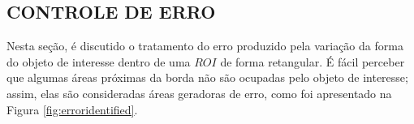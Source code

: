 \subsection{CONTROLE DE ERRO}

Nesta seção, é discutido o tratamento do erro produzido pela variação da forma do objeto de interesse dentro de uma
$ROI$ de forma retangular. É fácil perceber que algumas áreas próximas da borda não são ocupadas pelo objeto de interesse;
assim, elas são consideradas áreas geradoras de erro, como foi apresentado na Figura \ref{fig:erroridentified}.

